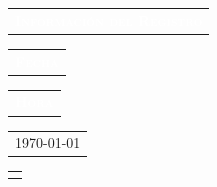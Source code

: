 \documentclass[12pt]{report}
\newcommand\wcolor{mycolor}
\newcommand\wcolorC{mycolorC}
\begin{document}
{\myfont
\noindent
\begin{minipage}{\textwidth}
	\begin{tabular}{l}
		\begin{minipage}[t]{0.5\textwidth}%
			\cellcolor{\wcolor}\textcolor{white}{\textsc{\textbf{Información del Registro}}}
		\end{minipage}
	\end{tabular}	
\end{minipage}


\noindent
\begin{minipage}{\textwidth}
	\begin{tabular}{l}
		\begin{minipage}[t]{0.65\textwidth}%
			\cellcolor{\wcolorC}\textcolor{white}{\textsc{\textbf{Fecha}}}
		\end{minipage}
	\end{tabular}	
	\begin{tabular}{l}
		\begin{minipage}[t]{0.325\textwidth}%
			\centering
			\cellcolor{\wcolorC}\textcolor{white}{\textsc{\textbf{Hora}}}
		\end{minipage}
	\end{tabular}	
\end{minipage}
\noindent
\begin{minipage}{\textwidth}
	\begin{tabular}{l}
		\begin{minipage}[t]{0.65\textwidth}%
			\today
		\end{minipage}
	\end{tabular}	
	\begin{tabular}{c}
		\begin{minipage}[t]{0.325\textwidth}
			\centering
			\currenttime
		\end{minipage}
	\end{tabular}	
\end{minipage}

}
\end{document}
